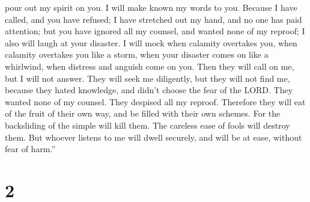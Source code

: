 pour out my spirit on you. I will make known my words to you.
 Because I have called, and you have refused; I have
stretched out my hand, and no one has paid attention;  but
you have ignored all my counsel, and wanted none of my reproof;
 I also will laugh at your disaster. I will mock when
calamity overtakes you,  when calamity overtakes you like a
storm, when your disaster comes on like a whirlwind, when distress and
anguish come on you.  Then they will call on me, but I will
not answer. They will seek me diligently, but they will not find me,
 because they hated knowledge, and didn't choose the fear
of the LORD.  They wanted none of my counsel. They despised
all my reproof.  Therefore they will eat of the fruit of
their own way, and be filled with their own schemes.  For
the backsliding of the simple will kill them. The careless ease of fools
will destroy them.  But whoever listens to me will dwell
securely, and will be at ease, without fear of harm.''

\hypertarget{section-1}{%
\section{2}\label{section-1}}

